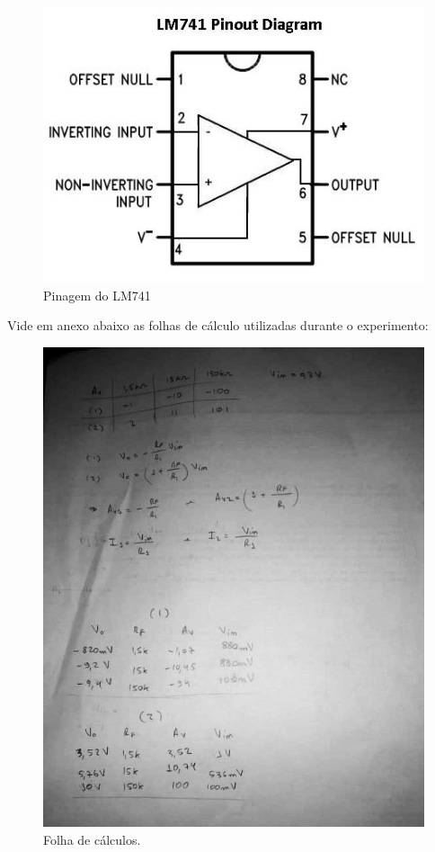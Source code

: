 \begin{figure}[H] 
\includegraphics[scale=0.75]{imagens/LM741.jpg} 
\centering
\caption{Pinagem do LM741}
\label{fig:ninv} 
\end{figure} 



Vide em anexo abaixo as folhas de cálculo utilizadas durante o experimento:

\begin{figure}[H] 
\includegraphics[scale=1]{imagens/calc.png} 
\centering
\caption{Folha de cálculos.}
\label{calc:1} 
\end{figure} 





     







